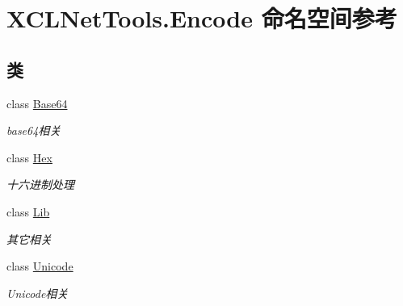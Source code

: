 \hypertarget{namespace_x_c_l_net_tools_1_1_encode}{}\section{X\+C\+L\+Net\+Tools.\+Encode 命名空间参考}
\label{namespace_x_c_l_net_tools_1_1_encode}
\subsection*{类}
\begin{DoxyCompactItemize}
\item 
class \hyperlink{class_x_c_l_net_tools_1_1_encode_1_1_base64}{Base64}
\begin{DoxyCompactList}\small\item\em base64相关 \end{DoxyCompactList}\item 
class \hyperlink{class_x_c_l_net_tools_1_1_encode_1_1_hex}{Hex}
\begin{DoxyCompactList}\small\item\em 十六进制处理 \end{DoxyCompactList}\item 
class \hyperlink{class_x_c_l_net_tools_1_1_encode_1_1_lib}{Lib}
\begin{DoxyCompactList}\small\item\em 其它相关 \end{DoxyCompactList}\item 
class \hyperlink{class_x_c_l_net_tools_1_1_encode_1_1_unicode}{Unicode}
\begin{DoxyCompactList}\small\item\em Unicode相关 \end{DoxyCompactList}\end{DoxyCompactItemize}
